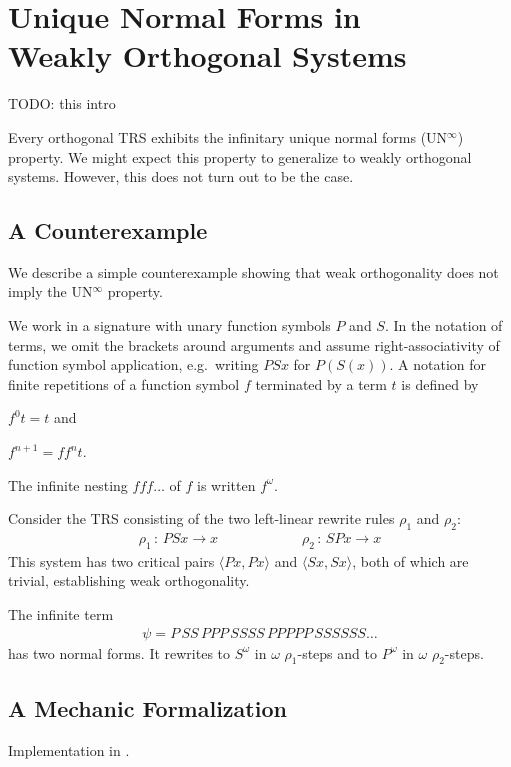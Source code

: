 \chapter{\texorpdfstring{Unique Normal Forms in\\Weakly Orthogonal
  Systems}{Unique Normal Forms in Weakly Orthogonal Systems}}\label{chap:unwo}

TODO: this intro

Every orthogonal TRS exhibits the infinitary unique normal forms
(UN$^\infty$) property. We might expect this property to generalize to
weakly orthogonal systems. However, this does not turn out to be the
case.


\section{A Counterexample}

We describe a simple counterexample showing that weak orthogonality
does not imply the UN$^\infty$ property.

We work in a signature with unary function symbols $P$ and $S$. In the
notation of terms, we omit the brackets around arguments and assume
right-associativity of function symbol application, e.g.\ writing
$PSx$ for $P(S(x))$. A notation for finite repetitions of a function
symbol $f$ terminated by a term $t$ is defined by
\begin{inparaenum}[(i)]
\item $f^0 t = t$ and
\item $f^{n+1} = ff^nt$.
\end{inparaenum}
The infinite nesting $fff \ldots$ of $f$ is written $f^\omega$.

Consider the TRS consisting of the two left-linear rewrite rules
$\rho_1$ and $\rho_2$:
\begin{align*}
  \rho_1 \, : \, PSx \to x \qquad \qquad \qquad
  \rho_2 \, : \, SPx \to x
\end{align*}
This system has two critical pairs $\langle Px, Px \rangle$ and
$\langle Sx, Sx \rangle$, both of which are trivial, establishing
weak orthogonality.

The infinite term
\begin{align*}
  \psi = P \, SS \, PPP \, SSSS \, PPPPP \, SSSSSS \ldots
\end{align*}
has two normal forms. It rewrites to $S^\omega$ in $\omega$
$\rho_1$-steps and to $P^\omega$ in $\omega$ $\rho_2$-steps.


\section{A Mechanic Formalization}

Implementation in \Coq.
